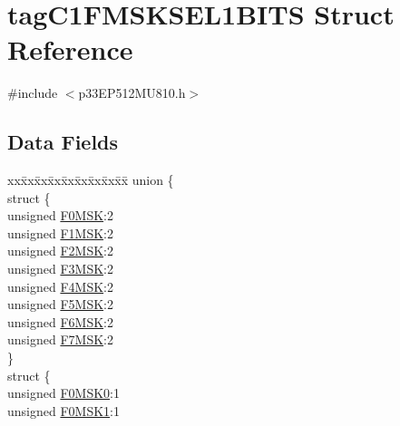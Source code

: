 \hypertarget{structtag_c1_f_m_s_k_s_e_l1_b_i_t_s}{}\section{tag\+C1\+F\+M\+S\+K\+S\+E\+L1\+B\+I\+TS Struct Reference}
\label{structtag_c1_f_m_s_k_s_e_l1_b_i_t_s}


{\ttfamily \#include $<$p33\+E\+P512\+M\+U810.\+h$>$}

\subsection*{Data Fields}
\begin{DoxyCompactItemize}
\item 
\begin{tabbing}
xx\=xx\=xx\=xx\=xx\=xx\=xx\=xx\=xx\=\kill
union \{\\
\>struct \{\\
\>\>unsigned \hyperlink{structtag_c1_f_m_s_k_s_e_l1_b_i_t_s_ab644e66a0cb1fa8ebe0eb8edf2fdeb65}{F0MSK}:2\\
\>\>unsigned \hyperlink{structtag_c1_f_m_s_k_s_e_l1_b_i_t_s_a80d211c92d09eff43c188fa37806521f}{F1MSK}:2\\
\>\>unsigned \hyperlink{structtag_c1_f_m_s_k_s_e_l1_b_i_t_s_a5089e591bc66271758ae06d5b1e16d4b}{F2MSK}:2\\
\>\>unsigned \hyperlink{structtag_c1_f_m_s_k_s_e_l1_b_i_t_s_a7b7ece0bd35899c92a42b741f3ae84b6}{F3MSK}:2\\
\>\>unsigned \hyperlink{structtag_c1_f_m_s_k_s_e_l1_b_i_t_s_a65ead43e093ca7f024c50adb447538e3}{F4MSK}:2\\
\>\>unsigned \hyperlink{structtag_c1_f_m_s_k_s_e_l1_b_i_t_s_afc1994ee77be029f668973159b50255a}{F5MSK}:2\\
\>\>unsigned \hyperlink{structtag_c1_f_m_s_k_s_e_l1_b_i_t_s_ac04675bc836b795f0d136ca8324d4df3}{F6MSK}:2\\
\>\>unsigned \hyperlink{structtag_c1_f_m_s_k_s_e_l1_b_i_t_s_a50fce8d5fa31f23a5c22db25853b6c4d}{F7MSK}:2\\
\>\} \\
\>struct \{\\
\>\>unsigned \hyperlink{structtag_c1_f_m_s_k_s_e_l1_b_i_t_s_a03a07b75f432dd5ad6d56cabbd781ffa}{F0MSK0}:1\\
\>\>unsigned \hyperlink{structtag_c1_f_m_s_k_s_e_l1_b_i_t_s_a493a191d3740c047cb36fb697198c08d}{F0MSK1}:1\\

\end{tabbing}
\end{DoxyCompactItemize}
